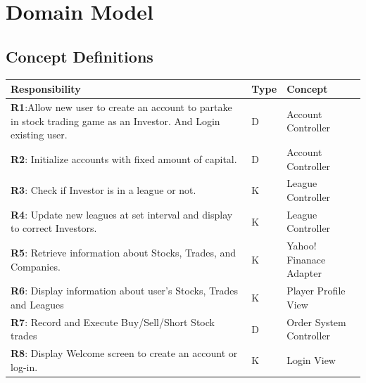 \chapter{Domain Model}

\section{Concept Definitions}

\begin{centering}
\renewcommand\arraystretch{1.3}
\label{UC-3}
\begin{longtable}{|p{4in}| p{.4in}| p{1.5in} |}
\hline
\bfseries{\color{color1}Responsibility} &
          \bfseries{\color{color1}Type} &
          \bfseries{\color{color1}Concept} \\ \hline
          \textbf{R1}:Allow new user to create an account to partake in stock trading game
          as an Investor. And Login existing user. &
                                                 D & Account Controller \\ \hline

          \textbf{R2}: Initialize accounts with fixed amount of capital. &
                     D & Account Controller \\ \hline
          \textbf{R3}: Check if Investor is in a league or not. & K & League Controller \\ \hline
          \textbf{R4}: Update new leagues at set interval and display to correct Investors. & K
                                             & League Controller \\ \hline
          \textbf{R5}: Retrieve information about Stocks, Trades, and Companies. & K
                                             & Yahoo! Finanace Adapter \\ \hline
          \textbf{R6}: Display information about user’s Stocks, Trades and Leagues & K
                                             & Player Profile View \\ \hline
           \textbf{R7}: Record and Execute Buy/Sell/Short Stock trades & D
                                              & Order System Controller \\ \hline
          \textbf{R8}: Display Welcome screen to create an account or log-in. & K &
                                                Login View \\ \hline

\end{longtable}
\end{centering}

